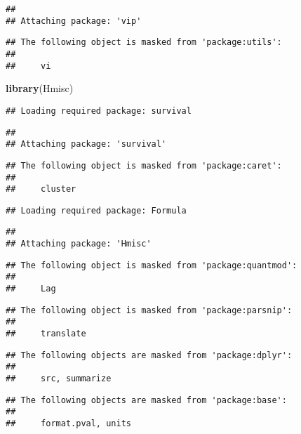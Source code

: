 \documentclass[
]{article}
\newenvironment{Shaded}{\begin{snugshade}}{\end{snugshade}}
\newcommand{\KeywordTok}[1]{\textcolor[rgb]{0.13,0.29,0.53}{\textbf{#1}}}
\newcommand{\NormalTok}[1]{#1}
\begin{document}
\begin{verbatim}
## 
## Attaching package: 'vip'
\end{verbatim}

\begin{verbatim}
## The following object is masked from 'package:utils':
## 
##     vi
\end{verbatim}

\begin{Shaded}
\begin{Highlighting}[]
\KeywordTok{library}\NormalTok{(Hmisc)}
\end{Highlighting}
\end{Shaded}

\begin{verbatim}
## Loading required package: survival
\end{verbatim}

\begin{verbatim}
## 
## Attaching package: 'survival'
\end{verbatim}

\begin{verbatim}
## The following object is masked from 'package:caret':
## 
##     cluster
\end{verbatim}

\begin{verbatim}
## Loading required package: Formula
\end{verbatim}

\begin{verbatim}
## 
## Attaching package: 'Hmisc'
\end{verbatim}

\begin{verbatim}
## The following object is masked from 'package:quantmod':
## 
##     Lag
\end{verbatim}

\begin{verbatim}
## The following object is masked from 'package:parsnip':
## 
##     translate
\end{verbatim}

\begin{verbatim}
## The following objects are masked from 'package:dplyr':
## 
##     src, summarize
\end{verbatim}

\begin{verbatim}
## The following objects are masked from 'package:base':
## 
##     format.pval, units
\end{verbatim}
\end{document}

